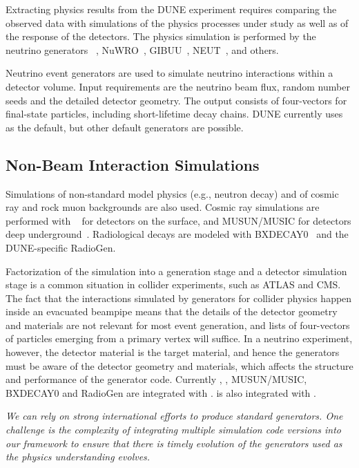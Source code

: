 \documentclass[../main-v1.tex]{subfiles}
\begin{document}
Extracting physics results from the DUNE experiment requires comparing the observed data with simulations %
of the physics processes under study as well as of the response of the detectors.  The physics simulation is performed by the neutrino generators ~\cite{Andreopoulos:2009rq}, NuWRO~\cite{NuWro2012}, GIBUU~\cite{Gallmeister:2016dnq}, NEUT~\cite{Hayato:2009zz}, and others. 

Neutrino event generators are used to simulate neutrino interactions within a detector volume.  Input requirements are the neutrino beam flux, random number seeds and the detailed detector geometry. The output consists of four-vectors for final-state particles, including short-lifetime decay chains.  DUNE currently uses ~\cite{GENIE} as the default, but other default generators are possible. 

\subsection{Non-Beam Interaction Simulations}
Simulations of non-standard model physics (e.g., neutron decay) and of cosmic ray and rock muon backgrounds are also used.  Cosmic ray simulations are performed with ~\cite{Wentz:2003bp,Dembinski:2020wrp} for detectors on the surface, and MUSUN/MUSIC for detectors deep underground~\cite{Kudryavtsev:2008qh,LBNEDOCDB9673}.  Radiological decays are modeled with BXDECAY0~\cite{Ponkratenko:2000um} and the DUNE-specific RadioGen.

Factorization of the simulation into a generation stage and a detector simulation stage is a common situation  in collider experiments, such as ATLAS and CMS.  The fact that the interactions simulated by generators for collider physics happen inside an evacuated beampipe means that the details of the detector geometry and materials are not relevant for most event generation, and lists of four-vectors of particles emerging from a primary vertex will suffice.  In a neutrino experiment, however, the detector material is the target material, and hence the generators must be aware of the detector geometry and materials, which affects the structure and performance of the generator code.  Currently , , MUSUN/MUSIC, BXDECAY0 and RadioGen are integrated with .   is also integrated with .

{\it We can rely on strong international efforts to produce standard generators. One challenge is the complexity of integrating multiple simulation code versions into our framework to ensure that there is timely evolution of the generators used as the physics understanding evolves.}
\end{document}
